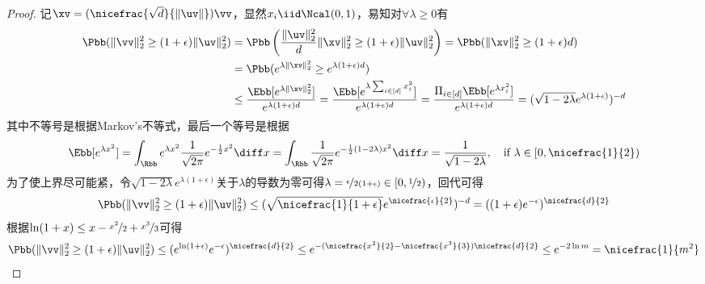\documentclass{ctexart}
\begin{document}
\begin{proof}
    记$\xv = (\nicefrac{\sqrt{d}}{\|\uv\|}) \vv$，显然$x_i \iid \Ncal(0,1)$，易知对$\forall \lambda \ge 0$有
    \begin{align*}
        \Pbb ( \| \vv \|_2^2 \ge (1 + \epsilon) \|\uv\|_2^2)
         & = \Pbb \left( \frac{\|\uv\|_2^2}{d} \| \xv \|_2^2 \ge (1 + \epsilon) \|\uv\|_2^2 \right) = \Pbb (\| \xv \|_2^2 \ge (1 + \epsilon) d)                                                                                                                                                             \\
         & = \Pbb (e^{\lambda \|\xv \|_2^2} \ge e^{\lambda (1 + \epsilon) d})                                                                                                                                                                                                                               \\
         & \le \frac{\Ebb [e^{\lambda \|\xv \|_2^2}]}{e^{\lambda (1 + \epsilon) d}} = \frac{\Ebb[e^{\lambda \sum_{i \in [d]} x_i^2}]}{e^{\lambda (1 + \epsilon) d}} = \frac{\Pi_{i \in [d]} \Ebb[e^{\lambda x_i^2}]}{e^{\lambda (1 + \epsilon) d}} = (\sqrt{1 - 2 \lambda} e^{\lambda (1 + \epsilon)})^{-d}
    \end{align*}
    其中不等号是根据Markov's不等式，最后一个等号是根据
    \begin{align*}
        \Ebb [e^{\lambda x^2}] = \int_\Rbb e^{\lambda x^2} \frac{1}{\sqrt{2 \pi}} e^{-\frac{1}{2} x^2} \diff x = \int_\Rbb \frac{1}{\sqrt{2 \pi}} e^{-\frac{1}{2} (1 - 2\lambda) x^2} \diff x = \frac{1}{\sqrt{1 - 2\lambda}}, \quad \text{if } \lambda \in [0, \nicefrac{1}{2})
    \end{align*}
    为了使上界尽可能紧，令$\sqrt{1 - 2 \lambda} e^{\lambda (1 + \epsilon)}$关于$\lambda$的导数为零可得$\lambda = \nicefrac{\epsilon}{2 (1+\epsilon)} \in [0, \nicefrac{1}{2})$，回代可得
    \begin{align*}
        \Pbb ( \| \vv \|_2^2 \ge (1 + \epsilon) \|\uv\|_2^2) \le (\sqrt{\nicefrac{1}{1+\epsilon}} e^{\nicefrac{\epsilon}{2}})^{-d} = ( (1 + \epsilon) e^{-\epsilon} )^{\nicefrac{d}{2}}
    \end{align*}
    根据$\ln (1 + x) \le x - \nicefrac{x^2}{2} + \nicefrac{x^3}{3}$可得
    \begin{align*}
        \Pbb ( \| \vv \|_2^2 \ge (1 + \epsilon) \|\uv\|_2^2) \le ( e^{\ln (1 + \epsilon)} e^{-\epsilon} )^{\nicefrac{d}{2}} \le e^{- (\nicefrac{x^2}{2} - \nicefrac{x^3}{3}) {\nicefrac{d}{2}} } \le e^{-2 \ln m} = \nicefrac{1}{m^2}
    \end{align*}



\end{proof}
\end{document}

